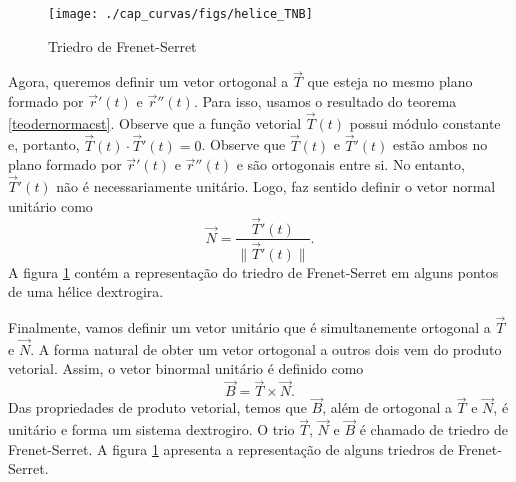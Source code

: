 \begin{figure}%
\begin{center}
    \texttt{[image: ./cap\_curvas/figs/helice\_TNB]}
\caption{Triedro de Frenet-Serret}\label{Frenet_Serret}
  \end{center}
\end{figure}


Agora, queremos definir um vetor ortogonal a $\vec{T}$ que esteja no mesmo plano formado por $\vec{r}'(t)$ e $\vec{r}''(t)$. Para isso, usamos o resultado do teorema \ref{teodernormacst}. Observe que a função vetorial $\vec{T}(t)$ possui módulo constante e, portanto, $\vec{T}(t)\cdot \vec{T}'(t)=0$. Observe que $\vec{T}(t)$ e $\vec{T}'(t)$ estão ambos no plano formado por $\vec{r}'(t)$ e $\vec{r}''(t)$ e são ortogonais entre si. No entanto, $\vec{T}'(t)$ não é necessariamente unitário. Logo, faz sentido definir o vetor normal unitário como
$$
\vec{N}=\frac{\vec{T}'(t)}{\|\vec{T}'(t)\|}.
$$
A figura \ref{Frenet_Serret} contém a representação do triedro de Frenet-Serret em alguns pontos de uma hélice dextrogira.

Finalmente, vamos definir um vetor unitário que é simultanemente ortogonal a $\vec{T}$ e $\vec{N}$. A forma natural de obter um vetor ortogonal a outros dois vem do produto vetorial. Assim, o vetor binormal unitário é definido como
$$
\vec{B}=\vec{T}\times\vec{N}.
$$
Das propriedades de produto vetorial, temos que $\vec{B}$, além de ortogonal a $\vec{T}$ e $\vec{N}$, é unitário e forma um sistema dextrogiro. O trio $\vec{T}$, $\vec{N}$ e $\vec{B}$ é chamado de triedro de Frenet-Serret. A figura \ref{Frenet_Serret} apresenta a representação de alguns triedros de Frenet-Serret.



